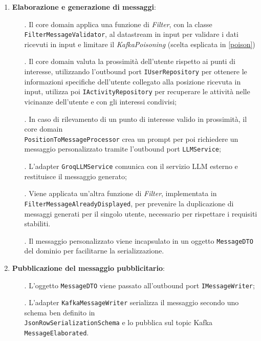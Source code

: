 \documentclass[10pt]{article}
\begin{document}
\begin{enumerate}
        \item \textbf{Elaborazione e generazione di messaggi}:
        \begin{itemize}
            \item[.] Il core domain applica una funzione di \textit{Filter}, con la classe \texttt{FilterMessageValidator}, al datastream in input per validare i dati ricevuti in input e limitare il \textit{KafkaPoisoning} (scelta esplicata in \ref{poison})
            \item[.] Il core domain valuta la prossimità dell'utente rispetto ai punti di interesse, utilizzando l'outbound port \texttt{IUserRepository} per ottenere le informazioni specifiche dell'utente collegato alla posizione ricevuta in input, utilizza poi \texttt{IActivityRepository} per recuperare le attività nelle vicinanze dell'utente e con gli interessi condivisi;
            \item[.] In caso di rilevamento di un punto di interesse valido in prossimità, il core domain \\\texttt{PositionToMessageProcessor} crea un prompt per poi richiedere un messaggio personalizzato tramite l'outbound port \texttt{LLMService};
            \item[.] L'adapter \texttt{GroqLLMService} comunica con il servizio LLM esterno e restituisce il messaggio generato;
            \item[.] Viene applicata un'altra funzione di \textit{Filter}, implementata in \texttt{FilterMessageAlreadyDisplayed}, per prevenire la duplicazione di messaggi generati per il singolo utente, necessario per rispettare i requisiti stabiliti. 
            \item[.] Il messaggio personalizzato viene incapsulato in un oggetto \texttt{MessageDTO} del dominio per facilitarne la serializzazione.
        \end{itemize}

        \item \textbf{Pubblicazione del messaggio pubblicitario}:
        \begin{itemize}
            \item[.] L'oggetto \texttt{MessageDTO} viene passato all'outbound port \texttt{IMessageWriter};
            \item[.] L'adapter \texttt{KafkaMessageWriter} serializza il messaggio secondo uno schema ben definito in \\ \texttt{JsonRowSerializationSchema} e lo pubblica sul topic Kafka \texttt{MessageElaborated}.
        \end{itemize}


\end{enumerate}
\end{document}

